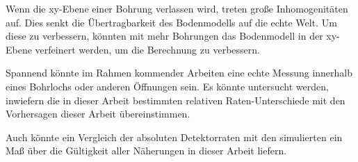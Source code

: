 Wenn die xy-Ebene einer Bohrung verlassen wird, treten große Inhomogenitäten auf.
Dies senkt die Übertragbarkeit des Bodenmodells auf die echte Welt.
Um diese zu verbessern, könnten mit mehr Bohrungen das Bodenmodell in der xy-Ebene verfeinert werden,
um die Berechnung zu verbessern.

Spannend könnte im Rahmen kommender Arbeiten eine echte 
Messung innerhalb eines Bohrlochs oder anderen Öffnungen sein.
Es könnte untersucht werden, inwiefern die in dieser Arbeit bestimmten
relativen Raten-Unterschiede mit den Vorhersagen dieser Arbeit übereinstimmen.

Auch könnte ein Vergleich der absoluten Detektorraten mit den simulierten
ein Maß über die Gültigkeit aller Näherungen in dieser Arbeit liefern. 


